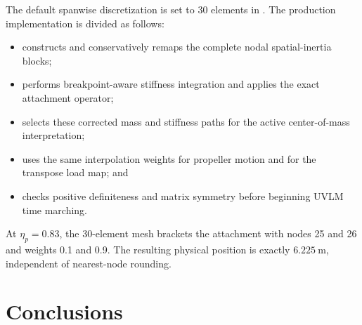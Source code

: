 \documentclass[11pt,a4paper]{article}
\begin{document}
The default spanwise discretization is set to 30 elements in
.  The production implementation is divided as follows:
\begin{itemize}
  \item {} constructs and conservatively remaps
        the complete nodal spatial-inertia blocks;
  \item {} performs breakpoint-aware
        stiffness integration and applies the exact attachment operator;
  \item {} selects these corrected mass and
        stiffness paths for the active center-of-mass interpretation;
  \item {} uses the same interpolation weights for
        propeller motion and for the transpose load map; and
  \item {} checks positive definiteness
        and matrix symmetry before beginning UVLM time marching.
\end{itemize}

At \(\eta_p=0.83\), the 30-element mesh brackets the attachment with nodes 25
and 26 and weights 0.1 and 0.9.  The resulting physical position is exactly
\(6.225\ \mathrm{m}\), independent of nearest-node rounding.

\section{Conclusions}
\end{document}
